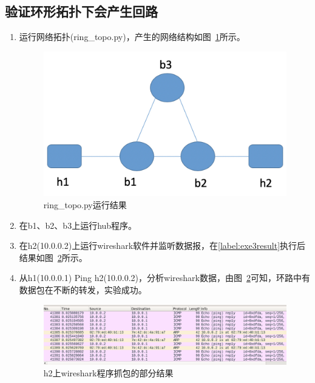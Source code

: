 \documentclass{zjureport}
\begin{document}
  \subsection{验证环形拓扑下会产生回路}
  \begin{enumerate}
    \item 运行网络拓扑(ring\_topo.py)，产生的网络结构如图~\ref{fig:13}所示。
      \begin{figure}[!htbp]
        \centering
        \includegraphics[width=0.7\linewidth]{figures/13.jpg}
        \caption{ring\_topo.py运行结果}
        \label{fig:13}
      \end{figure}

    \item 在b1、b2、b3上运行hub程序。

    \item 在h2(10.0.0.2)上运行wireshark软件并监听数据报，在\ref{label:exe3result}执行后结果如图~\ref{fig:14}所示。

    \item \label{label:exe3result} 从h1(10.0.0.1) Ping h2(10.0.0.2)，分析wireshark数据，由图~\ref{fig:14}可知，环路中有数据包在不断的转发，实验成功。
      \begin{figure}[!htbp]
        \centering
        \includegraphics[width=0.9\linewidth]{figures/14.jpg}
        \caption{h2上wireshark程序抓包的部分结果}
        \label{fig:14}
      \end{figure}
  \end{enumerate}
\end{document}
